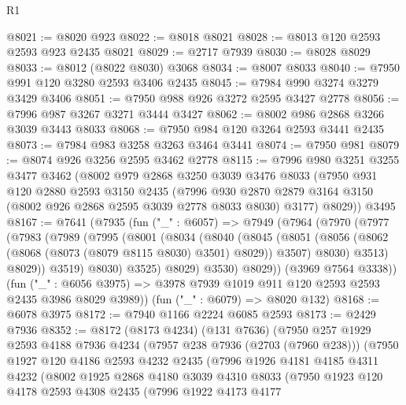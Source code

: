 \begin{lexlean}{R1}
\begin{coremodule}
@8021 := @8020 @923
@8022 := @8018 @8021
@8028 := @8013 @120 @2593 @2593 @923 @2435 @8021
@8029 := @2717 @7939
@8030 := @8028 @8029
@8033 := @8012 (@8022 @8030) @3068
@8034 := @8007 @8033
@8040 := @7950 @991 @120 @3280 @2593 @3406 @2435
@8045 := @7984 @990 @3274 @3279 @3429 @3406
@8051 := @7950 @988 @926 @3272 @2595 @3427 @2778
@8056 := @7996 @987 @3267 @3271 @3444 @3427
@8062 := @8002 @986 @2868 @3266 @3039 @3443 @8033
@8068 := @7950 @984 @120 @3264 @2593 @3441 @2435
@8073 := @7984 @983 @3258 @3263 @3464 @3441
@8074 := @7950 @981
@8079 := @8074 @926 @3256 @2595 @3462 @2778
@8115 := @7996
    @980
    @3251
    @3255
    @3477
    @3462
    (@8002
      @979
      @2868
      @3250
      @3039
      @3476
      @8033
      (@7950
        @931
        @120
        @2880
        @2593
        @3150
        @2435
        (@7996 @930 @2870 @2879 @3164 @3150 (@8002 @926 @2868 @2595 @3039 @2778 @8033 @8030) @3177)
        @8029))
    @3495
@8167 := @7641
    (@7935
      (fun ("_" : @6057) =>
      @7949
        (@7964
          (@7970
            (@7977
              (@7983
                (@7989
                  (@7995
                    (@8001
                      (@8034
                        (@8040
                          (@8045
                            (@8051
                              (@8056 (@8062 (@8068 (@8073 (@8079 @8115 @8030) @3501) @8029)) @3507)
                              @8030)
                            @3513)
                          @8029))
                      @3519)
                    @8030)
                  @3525)
                @8029)
              @3530)
            @8029))
        (@3969 @7564 @3338))
      (fun ("_" : @6056 @3975) => @3978 @7939 @1019 @911 @120 @2593 @2593 @2435 @3986 @8029 @3989))
    (fun ("_" : @6079) => @8020 @132)
@8168 := @6078 @3975
@8172 := @7940 @1166 @2224 @6085 @2593
@8173 := @2429 @7936
@8352 := @8172
    (@8173 @4234)
    (@131 @7636)
    (@7950
      @257
      @1929
      @2593
      @4188
      @7936
      @4234
      (@7957 @238 @7936 (@2703 (@7960 @238)))
      (@7950
        @1927
        @120
        @4186
        @2593
        @4232
        @2435
        (@7996
          @1926
          @4181
          @4185
          @4311
          @4232
          (@8002
            @1925
            @2868
            @4180
            @3039
            @4310
            @8033
            (@7950
              @1923
              @120
              @4178
              @2593
              @4308
              @2435
              (@7996
                @1922
                @4173
                @4177

\end{coremodule}
\end{lexlean}
